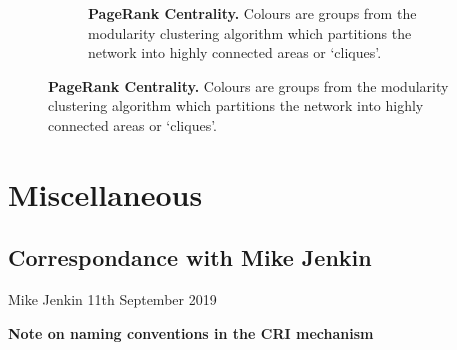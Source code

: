 \begin{figure}[H]
\begin{subfigure}[t]{.49\textwidth}
        \caption{ \textbf{PageRank Centrality.} Colours are groups from the modularity clustering algorithm which partitions the network into highly connected areas or `cliques'.}
\end{subfigure}
\end{figure}




\chapter{Miscellaneous}




\section{Correspondance with Mike Jenkin}\label{appendix:correspondance}
Mike Jenkin 11th September 2019

\textbf{Note on naming conventions in the CRI mechanism}\\

